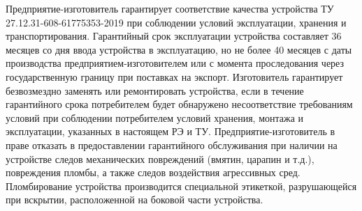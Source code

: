 \color{black}

Предприятие-изготовитель  гарантирует  соответствие  качества  устройства  ТУ  27.12.31-608-61775353-2019 при соблюдении условий эксплуатации, хранения и транспортирования. 
Гарантийный  срок  эксплуатации  устройства  составляет  36  месяцев  со  дня  ввода  устройства  в эксплуатацию, но не более 40 месяцев с даты производства предприятием-изготовителем или с момента проследования через государственную границу при поставках на экспорт. 
Изготовитель гарантирует безвозмездно заменять или ремонтировать устройства, если в течение гарантийного  срока  потребителем  будет  обнаружено  несоответствие  требованиям  условий  при соблюдении потребителем условий хранения, монтажа и эксплуатации, указанных в настоящем РЭ и ТУ. 
Предприятие-изготовитель  в  праве  отказать  в  предоставлении  гарантийного  обслуживания  при наличии на устройстве следов механических повреждений (вмятин, царапин и т.д.), повреждения пломбы, а также следов воздействия агрессивных сред. 
Пломбирование  устройства  производится  специальной  этикеткой,  разрушающейся  при  вскрытии, расположенной на боковой части устройства.